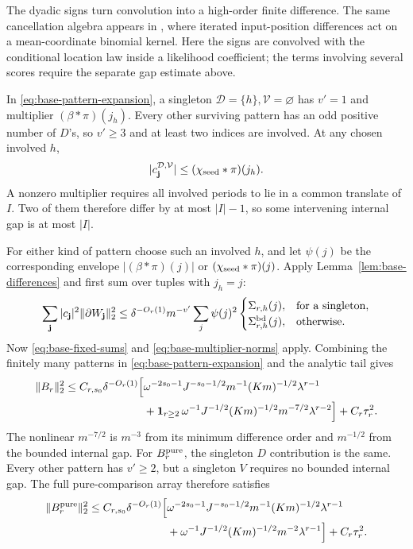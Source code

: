 The dyadic signs turn convolution into a high-order finite difference. The same cancellation algebra appears in
\citet[Section~3.2, equation~(3.10)]{HMPW2008}, where iterated input-position differences act on a mean-coordinate binomial kernel. Here the signs are convolved with the conditional location law inside a likelihood coefficient; the terms involving several scores require the separate gap estimate above.

In \eqref{eq:base-pattern-expansion}, a singleton
\(\mathcal D=\{h\},\mathcal V=\varnothing\) has \(v'=1\) and multiplier
\((\beta*\pi)(j_h)\). Every other surviving pattern has an odd positive number of \(D\)'s, so \(v'\ge3\) and at least two indices are involved. At any chosen involved \(h\),
\[
 |c_{\mathbf j}^{\mathcal D,\mathcal V}|
 \le(\chi_{\rm seed}*\pi)(j_h).
\]
A nonzero multiplier requires all involved periods to lie in a common translate of \(I\). Two of them therefore differ by at most \(|I|-1\), so some intervening internal gap is at most \(|I|\).

For either kind of pattern choose such an involved \(h\), and let
\(\psi(j)\) be the corresponding envelope
\(|(\beta*\pi)(j)|\) or \((\chi_{\rm seed}*\pi)(j)\).
Apply Lemma~\ref{lem:base-differences} and first sum over tuples with \(j_h=j\):
\[
 \sum_{\mathbf j}|c_{\mathbf j}|^2
        \|\partial W_{\mathbf j}\|_2^2
 \le \delta^{-O_r(1)}m^{-v'}
       \sum_j\psi(j)^2
       \begin{cases}
          \Sigma_{r,h}(j),&\text{for a singleton},\\
          \Sigma_{r,h}^{\rm bd}(j),&\text{otherwise}.
       \end{cases}
\]
Now \eqref{eq:base-fixed-sums} and \eqref{eq:base-multiplier-norms} apply. Combining the finitely many patterns in
\eqref{eq:base-pattern-expansion} and the analytic tail gives
\begin{equation}\label{eq:base-low-coefficients}
\begin{aligned}
 \|B_r\|_2^2\le C_{r,s_0}\delta^{-O_r(1)}\Big[
 &\omega^{-2s_0-1}J^{-s_0-1/2}m^{-1}(Km)^{-1/2}\lambda^{r-1}\\
 &+{\bf1}_{r\ge2}\,\omega^{-1}J^{-1/2}
           (Km)^{-1/2}m^{-7/2}\lambda^{r-2}\Big]+C_r\tau_r^2.
\end{aligned}
\end{equation}
The nonlinear \(m^{-7/2}\) is \(m^{-3}\) from its minimum difference order and \(m^{-1/2}\) from the bounded internal gap. For \(B_r^{\rm pure}\), the singleton \(D\) contribution is the same. Every other pattern has \(v'\ge2\), but a singleton \(V\) requires no bounded internal gap. The full pure-comparison array therefore satisfies
\begin{equation}\label{eq:base-pure-coefficients}
\begin{aligned}
 \|B_r^{\rm pure}\|_2^2\le C_{r,s_0}\delta^{-O_r(1)}\Big[
 &\omega^{-2s_0-1}J^{-s_0-1/2}m^{-1}(Km)^{-1/2}\lambda^{r-1}\\
 &+\omega^{-1}J^{-1/2}
       (Km)^{-1/2}m^{-2}\lambda^{r-1}\Big]+C_r\tau_r^2.
\end{aligned}
\end{equation}

